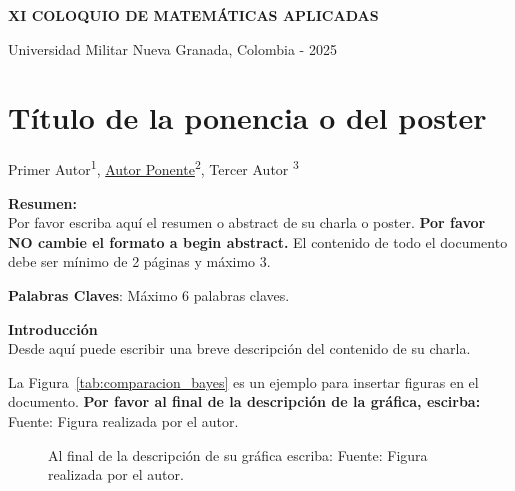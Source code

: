\documentclass[11pt]{article}
\newcommand{\ponente}[1]{\underline{#1}}
\let\cleardoublepage\clearpage
\begin{document}
\cleardoublepage
\begin{center}
	\textbf{\LARGE{XI COLOQUIO DE MATEM\'ATICAS APLICADAS }}\\
    {\Large Universidad Militar Nueva Granada, Colombia - 2025 \par}
	\vspace{0.4cm}
\end{center}
\section*{Título de la ponencia o del poster}
%
\thispagestyle{plain}
\vspace*{1cm}
\begin{center}
	{\large Primer Autor\textsuperscript{1}, \ponente{Autor Ponente}\textsuperscript{2}, Tercer Autor \textsuperscript{3}}\\[1em]
\end{center}


\noindent\textbf{Resumen:}\\
Por favor escriba aquí el resumen o abstract de su charla o poster. \textbf{Por favor NO cambie el formato a begin abstract.} El contenido de todo el documento debe ser mínimo de 2 páginas y máximo 3. 

\medskip
\noindent\textbf{Palabras Claves}: Máximo 6 palabras claves.

\vspace{1em}
\noindent\textbf{Introducción}\\
Desde aquí puede escribir una breve descripción del contenido de su charla.

La Figura~\ref{tab:comparacion_bayes} es un ejemplo para insertar figuras en el documento. \textbf{Por favor al final de la descripción de la gráfica, escirba:} Fuente: Figura realizada por el autor.



\begin{figure}[h!]
	\centering
	\caption{Al final de la descripción de su gráfica escriba: Fuente: Figura realizada por el autor.}
	\label{fig:bayes_poblacion}
\end{figure}
\end{document}
